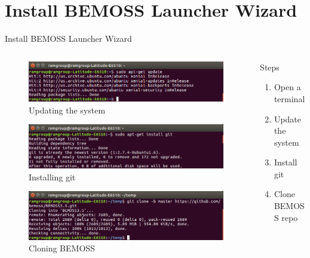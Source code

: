 \documentclass{beamer}
\begin{document}
\section{Install BEMOSS Launcher Wizard}

\begin{frame}{Install BEMOSS Launcher Wizard}{}
\begin{columns}[T]
	\begin{column}{0.5\textwidth}
		\begin{figure}
			\includegraphics[scale=0.2]{figs/aptgetUpdate.png}
			\caption{Updating the system}
		\end{figure}
		\begin{figure}
			\includegraphics[scale=0.2]{figs/installgit.png}
			\caption{Installing git}
		\end{figure}
		\begin{figure}
			\includegraphics[scale=0.2]{figs/clonebemoss.png}
			\caption{Cloning BEMOSS}
		\end{figure}
	\end{column}	
	\begin{column}{0.5\textwidth}
		\begin{block}{Steps}
			\begin{enumerate}
				\item Open a terminal
				\item Update the system
				\item Install git
				\item Clone BEMOSS repo
			\end{enumerate}
		\end{block}
	\end{column}
\end{columns}
\end{frame}
\end{document}
